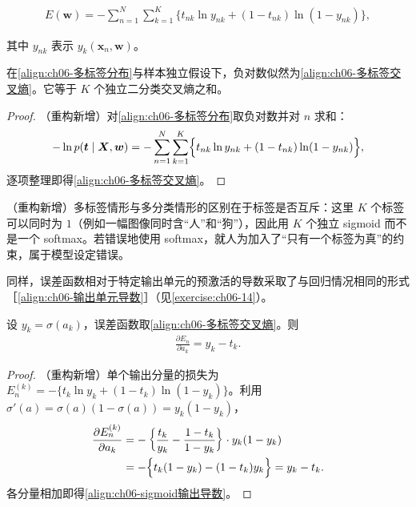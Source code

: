 \documentclass[../../main.tex]{subfiles}
\begin{document}
\begin{align}
E(\boldsymbol{w})=-\sum_{n=1}^{N}\sum_{k=1}^{K}\bigl\{t_{nk}\ln y_{nk}+(1-t_{nk})\ln(1-y_{nk})\bigr\},
\label{align:ch06-多标签交叉熵}
\end{align}

其中 $y_{nk}$ 表示 $y_k(\boldsymbol{x}_n,\boldsymbol{w})$。

\begin{proposition}[多标签交叉熵]\label{proposition:ch06-多标签交叉熵}
在\eqref{align:ch06-多标签分布}与样本独立假设下，负对数似然为\eqref{align:ch06-多标签交叉熵}。它等于 $K$ 个独立二分类交叉熵之和。
\end{proposition}

\begin{proof}
（重构新增）对\eqref{align:ch06-多标签分布}取负对数并对 $n$ 求和：
\begin{align}
-\ln p(\boldsymbol{t}\mid\boldsymbol{X},\boldsymbol{w})
=-\sum_{n=1}^{N}\sum_{k=1}^{K}\Bigl\{t_{nk}\ln y_{nk}+(1-t_{nk})\ln(1-y_{nk})\Bigr\},
\end{align}
逐项整理即得\eqref{align:ch06-多标签交叉熵}。
\end{proof}

\begin{remark}（重构新增）多标签情形与多分类情形的区别在于标签是否互斥：这里 $K$ 个标签可以同时为 $1$（例如一幅图像同时含“人”和“狗”），因此用 $K$ 个独立 sigmoid 而不是一个 softmax。若错误地使用 softmax，就人为加入了“只有一个标签为真”的约束，属于模型设定错误。
\end{remark}

同样，误差函数相对于特定输出单元的预激活的导数采取了与回归情况相同的形式［\eqref{align:ch06-输出单元导数}］（见\cref{exercise:ch06-14}）。

\begin{proposition}\label{proposition:ch06-sigmoid输出导数}
设 $y_k=\sigma(a_k)$，误差函数取\eqref{align:ch06-多标签交叉熵}。则
\begin{align}
\frac{\partial E_n}{\partial a_k}=y_k-t_k.
\label{align:ch06-sigmoid输出导数}
\end{align}
\end{proposition}

\begin{proof}
（重构新增）单个输出分量的损失为 $E_n^{(k)}=-\{t_k\ln y_k+(1-t_k)\ln(1-y_k)\}$。利用 $\sigma'(a)=\sigma(a)(1-\sigma(a))=y_k(1-y_k)$，
\begin{align}
\frac{\partial E_n^{(k)}}{\partial a_k}
&=-\left\{\frac{t_k}{y_k}-\frac{1-t_k}{1-y_k}\right\}\cdot y_k(1-y_k)\nonumber\\
&=-\Bigl\{t_k(1-y_k)-(1-t_k)y_k\Bigr\}=y_k-t_k .
\end{align}
各分量相加即得\eqref{align:ch06-sigmoid输出导数}。
\end{proof}
\end{document}
